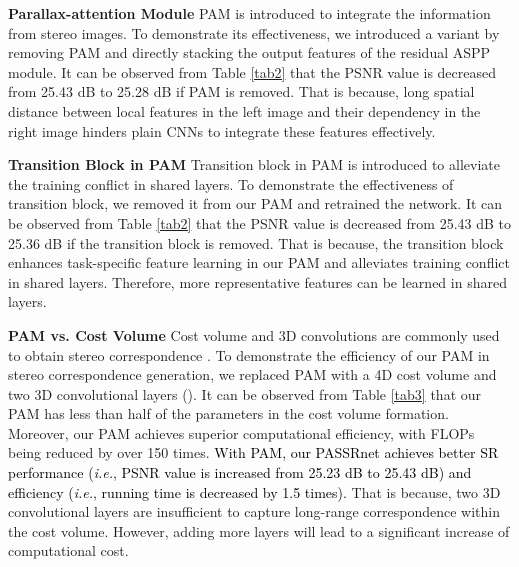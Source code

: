 \documentclass[10pt,twocolumn,letterpaper]{article}
\begin{document}
\noindent
\textbf{Parallax-attention Module}
PAM is introduced to integrate the information from stereo images. To demonstrate its effectiveness, we introduced a variant by removing PAM and directly stacking the output features of the residual ASPP module. It can be observed from Table \ref{tab2} that the PSNR value is decreased from 25.43 dB to 25.28 dB if PAM is removed. That is because, long spatial distance between local features in the left image and their dependency in the right image hinders plain CNNs to integrate these features effectively.

\noindent
\textbf{Transition Block in PAM}
Transition block in PAM is introduced to alleviate the training conflict in shared layers. To demonstrate the effectiveness of transition block, we removed it from our PAM and retrained the network.
It can be observed from Table \ref{tab2} that the PSNR value is decreased  from 25.43 dB to 25.36 dB if the transition block is removed. That is because, the  transition block enhances task-specific feature learning in our PAM and alleviates training conflict in shared layers. Therefore, more representative features can be learned in shared layers.

\noindent
\textbf{PAM vs. Cost Volume}
Cost volume and 3D convolutions are commonly used to obtain stereo correspondence \cite{2017-EndtoEndLearningofGeometryandContextforDeepStereoRegression-Kendall-66-75,2018-PyramidStereoMatchingNetwork-Chang--}. To demonstrate the efficiency of our PAM in stereo correspondence generation, we replaced PAM with a 4D cost volume and two 3D convolutional layers (). It can be observed from Table \ref{tab3} that our PAM has less than half of the parameters in the cost volume formation. Moreover, our PAM achieves superior computational efficiency, with FLOPs being reduced by over 150 times. \textcolor{black}{ With PAM, our PASSRnet achieves better SR performance (\emph{i.e.}, PSNR value is increased from 25.23 dB to 25.43 dB) and efficiency (\emph{i.e.}, running time is decreased by 1.5 times).} That is because, two 3D convolutional layers are insufficient to capture long-range correspondence within the cost volume. However, adding more layers will lead to a significant increase of computational cost.


\begin{table}[bt]
	\caption{Comparison between our PAM and the cost volume formation for  SR. FLOPs are calculated on  input features, while Time/PSNR/SSIM values are achieved on the KITTI 2015 dataset.}
	\label{tab3}
	\begin{center}
		\footnotesize
	\end{center}
\end{table}
\end{document}

